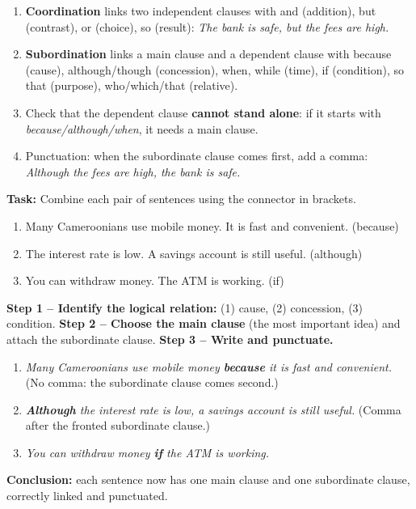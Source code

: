 \documentclass[11pt]{article}
\newcommand{\cle}[1]{{\popxbold\color{popdark}#1}}
\begin{document}
\begin{methode}
\begin{enumerate}
\item \textbf{Coordination} links two independent clauses with \cle{and} (addition), \cle{but} (contrast), \cle{or} (choice), \cle{so} (result): \emph{The bank is safe, but the fees are high.}
\item \textbf{Subordination} links a main clause and a dependent clause with \cle{because} (cause), \cle{although/though} (concession), \cle{when, while} (time), \cle{if} (condition), \cle{so that} (purpose), \cle{who/which/that} (relative).
\item Check that the dependent clause \textbf{cannot stand alone}: if it starts with \emph{because/although/when}, it needs a main clause.
\item Punctuation: when the subordinate clause comes first, add a comma: \emph{Although the fees are high, the bank is safe.}
\end{enumerate}
\end{methode}

\begin{exoresolu}
\textbf{Task:} Combine each pair of sentences using the connector in brackets.
\begin{enumerate}
\item Many Cameroonians use mobile money. It is fast and convenient. (because)
\item The interest rate is low. A savings account is still useful. (although)
\item You can withdraw money. The ATM is working. (if)
\end{enumerate}
\tcblower
\textbf{Step 1 -- Identify the logical relation:} (1) cause, (2) concession, (3) condition.
\textbf{Step 2 -- Choose the main clause} (the most important idea) and attach the subordinate clause.
\textbf{Step 3 -- Write and punctuate.}
\begin{enumerate}
\item \emph{Many Cameroonians use mobile money \textbf{because} it is fast and convenient.} (No comma: the subordinate clause comes second.)
\item \emph{\textbf{Although} the interest rate is low, a savings account is still useful.} (Comma after the fronted subordinate clause.)
\item \emph{You can withdraw money \textbf{if} the ATM is working.}
\end{enumerate}
\textbf{Conclusion:} each sentence now has one main clause and one subordinate clause, correctly linked and punctuated.
\end{exoresolu}
\end{document}
